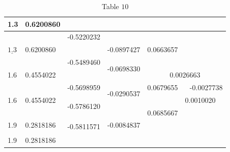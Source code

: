 \begin{table}
\centering
\begin{tabular}{|l|l|l|l|l|l|l|}
\hline
1.3 & 0.6200860 & \multicolumn{5}{|c|}{} \\
\hline
 &  & -0.5220232 &  & \multirow[b]{3}{*}{0.0663657} & \multirow{3}{*}{} & \multirow{3}{*}{} \\
\hline
$\underline{1.3}$ & 0.6200860 &  & -0.0897427 &  &  &  \\
\hline
 &  & -0.5489460 & \multirow[b]{2}{*}{-0.0698330} &  &  &  \\
\hline
1.6 & 0.4554022 &  &  & \multicolumn{3}{|c|}{0.0026663} \\
\hline
\multicolumn{2}{|c|}{} & -0.5698959 & \multirow[b]{2}{*}{-0.0290537} & 0.0679655 & \multicolumn{2}{|r|}{-0.0027738} \\
\hline
1.6 & 0.4554022 & \multirow[b]{2}{*}{-0.5786120} &  &  & 0.0010020 &  \\
\hline
\multicolumn{2}{|c|}{} &  &  & 0.0685667 &  &  \\
\hline
1.9 & 0.2818186 & \multirow[b]{2}{*}{-0.5811571} & -0.0084837 &  &  &  \\
\hline
\multicolumn{2}{|c|}{} &  &  &  &  &  \\
\hline
1.9 & 0.2818186 &  &  &  &  &  \\
\hline
\end{tabular}
\caption{\scriptsize Table $10$}
\label{tab:hermiteexample2}
\end{table}


